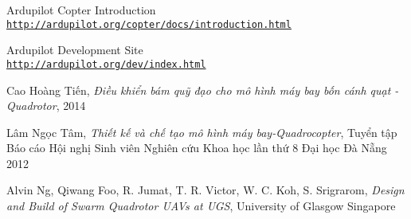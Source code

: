 \cleardoublepage
\renewcommand{\bibname}{Tài liệu tham khảo}
\begin{thebibliography}{80}

Ardupilot Copter Introduction
\\\texttt{\url{http://ardupilot.org/copter/docs/introduction.html}}

Ardupilot Development Site
\\\texttt{\url{http://ardupilot.org/dev/index.html}}

Cao Hoàng Tiến, \textit{Điều khiển bám quỹ đạo cho mô hình máy bay bốn cánh quạt - Quadrotor}, 2014

Lâm Ngọc Tâm, \textit{Thiết kế và chế tạo mô hình máy bay-Quadrocopter}, Tuyển tập Báo cáo Hội nghị Sinh viên Nghiên cứu Khoa học lần thứ 8 Đại học Đà Nẵng 2012

Alvin Ng, Qiwang Foo, R. Jumat, T. R. Victor, W. C. Koh, S. Srigrarom, \textit{Design and Build of Swarm Quadrotor UAVs at UGS}, University of Glasgow Singapore

\end{thebibliography}

